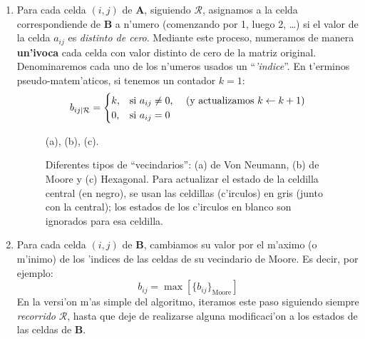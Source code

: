 \begin{enumerate}
  
\item Para cada celda $(i,j)$ de $\mathbf{A}$, siguiendo
  $\mathcal{R}$, asignamos a la celda correspondiende de $\mathbf{B}$
  a n'umero (comenzando por 1, luego 2, \ldots) si el valor de la
  celda $a_{ij}$ es \emph{distinto de cero}.  Mediante este proceso,
  numeramos de manera \textbf{un'ivoca} cada celda con valor distinto
  de cero de la matriz original.  Denominaremos cada uno de los
  n'umeros usados un ``\emph{'indice}''.  En t'erminos
  pseudo-matem'aticos, si tenemos un contador $k=1$:
  \begin{equation}
    \label{eq:islandsalg1}
    b_{ij|\mathcal{R}} = 
    \begin{cases}
      k, & \text{si $a_{ij}\neq 0$, \quad (y actualizamos $k \gets k+1$)}\\
      0, & \text{si $a_{ij}=0$}
    \end{cases}
  \end{equation}
  
\begin{figure}[hbt]
  \centering \mbox{}\hfill
  \hfill
  \hfill
  \hfill\mbox{}
  \ifenglish
  \caption[]{(a), (b), (c).} \else
  \caption[Diferentes tipos de ``vecindarios'']{Diferentes tipos de
    ``vecindarios'': (a) de Von Neumann, (b) de Moore y (c) Hexagonal.
    Para actualizar el estado de la celdilla central (en negro), se
    usan las celdillas (c'irculos) en gris (junto con la central); los
    estados de los c'irculos en blanco son ignorados para esa
    celdilla.} \fi
  \label{fig:neighborhood}
\end{figure}

\item Para cada celda $(i,j)$ de $\mathbf{B}$, cambiamos su valor por
  el m'aximo (o m'inimo) de los 'indices de las celdas de su
  vecindario de Moore. Es decir, por ejemplo:
  \begin{equation}
    \label{eq:islandsalg2}
    b_{ij} = \max[\{b_{ij}\}_{\text{Moore}}]
  \end{equation}
  En la versi'on m'as simple del algoritmo, iteramos este paso
  siguiendo siempre \emph{recorrido} $\mathcal{R}$, hasta que deje de
  realizarse alguna modificaci'on a los estados de las celdas de
  $\mathbf{B}$.
  

\end{enumerate}
